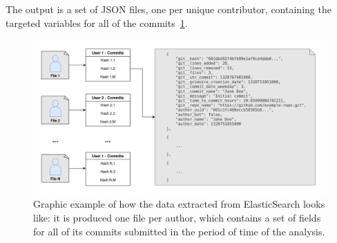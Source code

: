 \documentclass[a4paper, 12pt]{book}
\begin{document}
The output is a set of JSON files, one per unique contributor, containing the targeted variables for all of the commits~\ref{fig:example-users-commits-dataset}.

\begin{figure}
  \centering
  \includegraphics[width=16cm, keepaspectratio]{img/data-files-revelio-users-commits.drawio.png}
  \caption{Graphic example of how the data extracted from ElasticSearch looks like: it is produced one file per author, which contains a set of fields for all of its commits submitted in the period of time of the analysis.}
  \label{fig:example-users-commits-dataset}
\end{figure}
\end{document}
